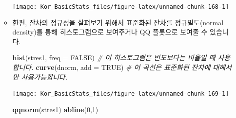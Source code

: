 \documentclass[]{book}
\newenvironment{Shaded}{\begin{snugshade}}{\end{snugshade}}
\newcommand{\CommentTok}[1]{\textcolor[rgb]{0.56,0.35,0.01}{\textit{#1}}}
\newcommand{\DataTypeTok}[1]{\textcolor[rgb]{0.13,0.29,0.53}{#1}}
\newcommand{\DecValTok}[1]{\textcolor[rgb]{0.00,0.00,0.81}{#1}}
\newcommand{\KeywordTok}[1]{\textcolor[rgb]{0.13,0.29,0.53}{\textbf{#1}}}
\newcommand{\NormalTok}[1]{#1}
\newcommand{\OperatorTok}[1]{\textcolor[rgb]{0.81,0.36,0.00}{\textbf{#1}}}
\newcommand{\OtherTok}[1]{\textcolor[rgb]{0.56,0.35,0.01}{#1}}
\newcommand{\StringTok}[1]{\textcolor[rgb]{0.31,0.60,0.02}{#1}}
\begin{document}
\begin{itemize}
\begin{itemize}
\begin{Shaded}
\end{Shaded}

    \begin{center}\texttt{[image: Kor\_BasicStats\_files/figure-latex/unnamed-chunk-168-1]} \end{center}
  \item
    한편, 잔차의 정규성을 살펴보기 위해서 표준화된 잔차를 정규밀도(normal density)를 통해 히스토그램으로 보여주거나 QQ 플롯으로 보여줄 수 있습니다.

\begin{Shaded}
\begin{Highlighting}[]
\KeywordTok{hist}\NormalTok{(stres1, }\DataTypeTok{freq =} \OtherTok{FALSE}\NormalTok{) }\CommentTok{# 이 히스토그램은 빈도보다는 비율일 때 사용합니다.}
\KeywordTok{curve}\NormalTok{(dnorm, }\DataTypeTok{add =} \OtherTok{TRUE}\NormalTok{)  }\CommentTok{# 이 곡선은 표준화된 잔차에 대해서만 사용가능합니다.}
\end{Highlighting}
\end{Shaded}

    \begin{center}\texttt{[image: Kor\_BasicStats\_files/figure-latex/unnamed-chunk-169-1]} \end{center}

\begin{Shaded}
\begin{Highlighting}[]
\KeywordTok{qqnorm}\NormalTok{(stres1)}
\KeywordTok{abline}\NormalTok{(}\DecValTok{0}\NormalTok{,}\DecValTok{1}\NormalTok{)}
\end{Highlighting}
\end{Shaded}


\end{itemize}
\end{itemize}
\end{document}
